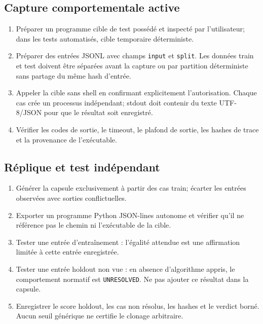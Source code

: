 \documentclass[11pt,a4paper]{article}
\begin{document}
\subsection{Capture comportementale active}
\begin{enumerate}[nosep]
\item Préparer un programme cible de test possédé et inspecté par l'utilisateur; dans les tests automatisés, cible temporaire déterministe.
\item Préparer des entrées JSONL avec champs \texttt{input} et \texttt{split}. Les données train et test doivent être séparées avant la capture ou par partition déterministe sans partage du même hash d'entrée.
\item Appeler la cible sans shell en confirmant explicitement l'autorisation. Chaque cas crée un processus indépendant; stdout doit contenir du texte UTF-8/JSON pour que le résultat soit enregistré.
\item Vérifier les codes de sortie, le timeout, le plafond de sortie, les hashes de trace et la provenance de l'exécutable.
\end{enumerate}

\subsection{Réplique et test indépendant}
\begin{enumerate}[nosep]
\item Générer la capsule exclusivement à partir des cas train; écarter les entrées observées avec sorties conflictuelles.
\item Exporter un programme Python JSON-lines autonome et vérifier qu'il ne référence pas le chemin ni l'exécutable de la cible.
\item Tester une entrée d'entraînement : l'égalité attendue est une affirmation limitée à cette entrée enregistrée.
\item Tester une entrée holdout non vue : en absence d'algorithme appris, le comportement normatif est \texttt{UNRESOLVED}. Ne pas ajouter ce résultat dans la capsule.
\item Enregistrer le score holdout, les cas non résolus, les hashes et le verdict borné. Aucun seuil générique ne certifie le clonage arbitraire.
\end{enumerate}
\end{document}
